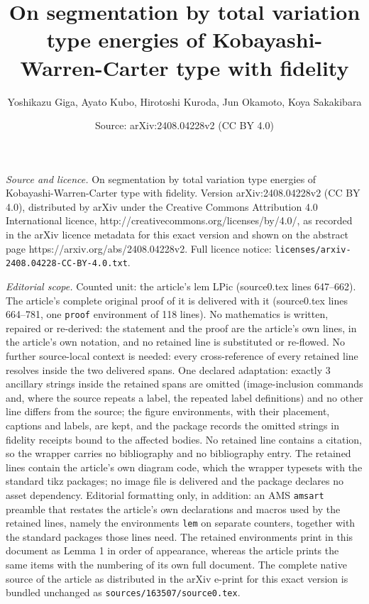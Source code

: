 \documentclass[10pt,a4paper]{amsart}
\title{On segmentation by total variation type energies of Kobayashi-Warren-Carter type with fidelity}
\author{Yoshikazu Giga, Ayato Kubo, Hirotoshi Kuroda, Jun Okamoto, Koya Sakakibara}
\date{Source: arXiv:2408.04228v2 (CC BY 4.0)}
\begin{document}
\maketitle

\noindent\emph{Source and licence.} On segmentation by total variation type energies of Kobayashi-Warren-Carter type with fidelity. Version arXiv:2408.04228v2 (CC BY 4.0), distributed by arXiv under the Creative Commons Attribution 4.0 International licence, http://creativecommons.org/licenses/by/4.0/, as recorded in the arXiv licence metadata for this exact version and shown on the abstract page https://arxiv.org/abs/2408.04228v2. Full licence notice: \texttt{licenses/arxiv-2408.04228-CC-BY-4.0.txt}.\par\smallskip

\noindent\textit{Editorial scope.} Counted unit: the article's lem LPic (source0.tex lines 647--662). The article's complete original proof of it is delivered with it (source0.tex lines 664--781, one \texttt{proof} environment of 118 lines). No mathematics is written, repaired or re-derived: the statement and the proof are the article's own lines, in the article's own notation, and no retained line is substituted or re-flowed.  No further source-local context is needed: every cross-reference of every retained line resolves inside the two delivered spans.  One declared adaptation: exactly 3 ancillary strings inside the retained spans are omitted (image-inclusion commands and, where the source repeats a label, the repeated label definitions) and no other line differs from the source; the figure environments, with their placement, captions and labels, are kept, and the package records the omitted strings in fidelity receipts bound to the affected bodies.  No retained line contains a citation, so the wrapper carries no bibliography and no bibliography entry.  The retained lines contain the article's own diagram code, which the wrapper typesets with the standard tikz packages; no image file is delivered and the package declares no asset dependency.  Editorial formatting only, in addition: an AMS \texttt{amsart} preamble that restates the article's own declarations and macros used by the retained lines, namely the environments \texttt{lem} on separate counters, together with the standard packages those lines need.  The retained environments print in this document as Lemma 1 in order of appearance, whereas the article prints the same items with the numbering of its own full document.  The complete native source of the article as distributed in the arXiv e-print for this exact version is bundled unchanged as \texttt{sources/163507/source0.tex}.
\end{document}
